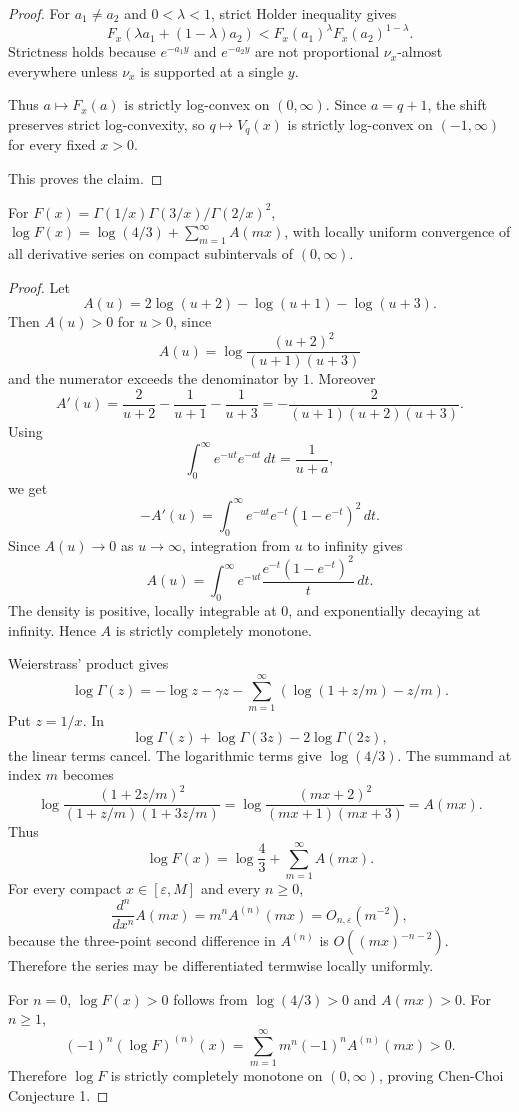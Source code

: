 \begin{proof}
For \(a_1\ne a_2\) and \(0<\lambda<1\), strict Holder inequality gives
\[
F_x(\lambda a_1+(1-\lambda)a_2)
<
F_x(a_1)^\lambda F_x(a_2)^{1-\lambda}.
\]
Strictness holds because \(e^{-a_1y}\) and \(e^{-a_2y}\) are not proportional \(\nu_x\)-almost everywhere unless \(\nu_x\) is supported at a single \(y\).

Thus \(a\mapsto F_x(a)\) is strictly log-convex on \((0,\infty)\). Since \(a=q+1\), the shift preserves strict log-convexity, so \(q\mapsto V_q(x)\) is strictly log-convex on \((-1,\infty)\) for every fixed \(x>0\).

This proves the claim.
\end{proof}

\begin{proposition}
\label{res:chen-choi-gurland-euler-sum-normal-form}
For \(F(x)=\Gamma(1/x)\Gamma(3/x)/\Gamma(2/x)^2\), \(\log F(x)=\log(4/3)+\sum_{m=1}^{\infty}A(mx)\), with locally uniform convergence of all derivative series on compact subintervals of \((0,\infty)\).
\end{proposition}
\begin{proof}
Let
\[
A(u)=2\log(u+2)-\log(u+1)-\log(u+3).
\]
Then \(A(u)>0\) for \(u>0\), since
\[
A(u)=\log\frac{(u+2)^2}{(u+1)(u+3)}
\]
and the numerator exceeds the denominator by \(1\).
Moreover
\[
A'(u)=\frac2{u+2}-\frac1{u+1}-\frac1{u+3}
=-\frac{2}{(u+1)(u+2)(u+3)}.
\]
Using
\[
\int_0^\infty e^{-ut}e^{-at}\,dt=\frac1{u+a},
\]
we get
\[
-A'(u)=\int_0^\infty e^{-ut}e^{-t}(1-e^{-t})^2\,dt.
\]
Since \(A(u)\to0\) as \(u\to\infty\), integration from \(u\) to infinity gives
\[
A(u)=\int_0^\infty e^{-ut}\frac{e^{-t}(1-e^{-t})^2}{t}\,dt.
\]
The density is positive, locally integrable at \(0\), and exponentially decaying at infinity. Hence \(A\) is strictly completely monotone.

Weierstrass' product gives
\[
\log\Gamma(z)=-\log z-\gamma z-
\sum_{m=1}^{\infty}\left(\log(1+z/m)-z/m\right).
\]
Put \(z=1/x\). In
\[
\log\Gamma(z)+\log\Gamma(3z)-2\log\Gamma(2z),
\]
the linear terms cancel. The logarithmic terms give \(\log(4/3)\). The summand at index \(m\) becomes
\[
\log\frac{(1+2z/m)^2}{(1+z/m)(1+3z/m)}
=\log\frac{(mx+2)^2}{(mx+1)(mx+3)}=A(mx).
\]
Thus
\[
\log F(x)=\log\frac43+\sum_{m=1}^{\infty}A(mx).
\]
For every compact \(x\in[\varepsilon,M]\) and every \(n\ge0\),
\[
\frac{d^n}{dx^n}A(mx)=m^nA^{(n)}(mx)=O_{n,\varepsilon}(m^{-2}),
\]
because the three-point second difference in \(A^{(n)}\) is \(O((mx)^{-n-2})\). Therefore the series may be differentiated termwise locally uniformly.

For \(n=0\), \(\log F(x)>0\) follows from \(\log(4/3)>0\) and \(A(mx)>0\). For \(n\ge1\),
\[
(-1)^n(\log F)^{(n)}(x)=
\sum_{m=1}^{\infty}m^n(-1)^nA^{(n)}(mx)>0.
\]
Therefore \(\log F\) is strictly completely monotone on \((0,\infty)\), proving Chen-Choi Conjecture 1.
\end{proof}

